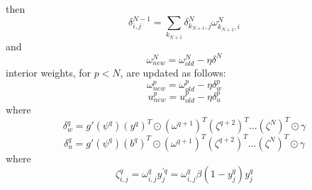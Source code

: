\documentclass{article}
\begin{document}
%
then
%
\begin{equation} \label{eq:delta2}
\delta_{i,j}^{N-1} =
\sum_{k_{N+1}} \delta_{k_{N+1},j}^N \omega_{k_{N+1},i}^N
\end{equation}
%
and
%
\begin{equation} \label{eq:end_weights}
\omega_{new}^N = \omega_{old}^N - \eta \delta^N
\end{equation}
%
interior weights, for $p < N$, are updated as follows:
%
\begin{equation} \label{eq:w_weights}
\omega_{new}^p = \omega_{old}^p - \eta \delta_w^p
\end{equation}
%
\begin{equation} \label{eq:u_weights}
u_{new}^p = u_{old}^p - \eta \delta_u^p
\end{equation}
%
where
%
\begin{equation} \label{eq:w_delta}
\delta_w^{q} = g'(\psi^{q}) (y^{q})^T \odot (\omega^{q+1})^T (\zeta^{q+2})^T ... (\zeta^N)^T \odot \gamma
\end{equation}
%
\begin{equation} \label{eq:u_delta}
\delta_u^{q} = g'(\psi^{q}) (b^{q})^T \odot (\omega^{q+1})^T (\zeta^{q+2})^T ... (\zeta^N)^T \odot \gamma
\end{equation}
%
where
%
\begin{equation} \label{eq:u_delta}
\zeta_{i,j}^q = \omega_{i,j}^q y_j^{\prime q} = \omega_{i,j}^q \beta (1 - y_j^q) y_j^q
\end{equation}
%
\end{document}
